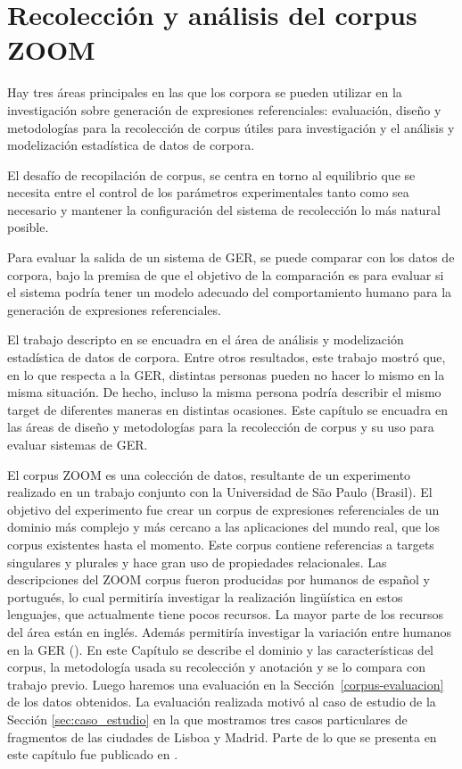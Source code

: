 \chapter{Recolecci\'on y an\'alisis del corpus ZOOM}
\label{sec:corpus}

Hay tres \'areas principales en las que los corpora se pueden utilizar en la investigaci\'on sobre generaci\'on de expresiones referenciales:
evaluaci\'on, dise\~no y metodolog\'ias para la recolecci\'on de corpus \'utiles para investigaci\'on y el an\'alisis y modelizaci\'on estad\'istica de datos de corpora.

El desaf\'io de recopilaci\'on de corpus, se centra en torno al equilibrio que se necesita
entre el control de los par\'ametros experimentales tanto como sea necesario
y mantener la configuraci\'on del sistema de recolecci\'on lo m\'as natural posible. 

Para evaluar la salida de un sistema de GER, se puede 
comparar con los datos de corpora, bajo la premisa de que el objetivo de la comparaci\'on es
para evaluar si el sistema podr\'ia tener un modelo adecuado del comportamiento humano para la generaci\'on de expresiones referenciales.

El trabajo descripto en \cite{viet:gene11} se encuadra en el \'area de an\'alisis y modelizaci\'on estad\'istica de datos de corpora. Entre otros resultados, este trabajo mostr\'o que, en lo que respecta a la GER, distintas personas pueden no  hacer lo mismo en la misma situaci\'on. De hecho, incluso la misma persona podr\'ia describir el mismo target de diferentes maneras en distintas ocasiones.
Este cap\'itulo se encuadra en las \'areas de dise\~no y metodolog\'ias para la recolecci\'on de corpus y su uso para evaluar sistemas de GER.

El corpus ZOOM es una colecci\'on de datos, resultante de un experimento realizado en un trabajo conjunto con la Universidad de S\~ao Paulo (Brasil). El objetivo del experimento fue crear un corpus de expresiones referenciales de un dominio m\'as complejo y m\'as cercano a las aplicaciones del mundo real, que los corpus existentes hasta el momento. Este corpus contiene referencias a targets singulares y plurales y hace gran uso de propiedades relacionales. Las descripciones del ZOOM corpus fueron producidas por humanos de espa\~nol y portugu\'es, lo cual permitir\'ia investigar la realizaci\'on ling\"u\'istica en estos lenguajes, que actualmente tiene pocos recursos. La mayor parte de los recursos del \'area est\'an en ingl\'es. Adem\'as permitir\'ia investigar la variaci\'on entre humanos en la GER (\cite{trainable-speaker,arec:2012:coling12,non-det}). 
En este Cap\'itulo se describe el dominio y las caracter\'isticas del corpus, la metodolog\'ia usada su recolecci\'on y anotaci\'on y se lo compara con trabajo previo. Luego haremos una evaluaci\'on en la Secci\'on~\ref{corpus-evaluacion} de los datos obtenidos. La evaluaci\'on realizada motiv\'o al caso de estudio de la Secci\'on \ref{sec:caso_estudio} en la que mostramos tres casos particulares de fragmentos de las ciudades de Lisboa y Madrid. Parte de lo que se presenta en este cap\'itulo fue publicado en \cite{DBLP:conf/acl/AltamiranoFPB15}.

